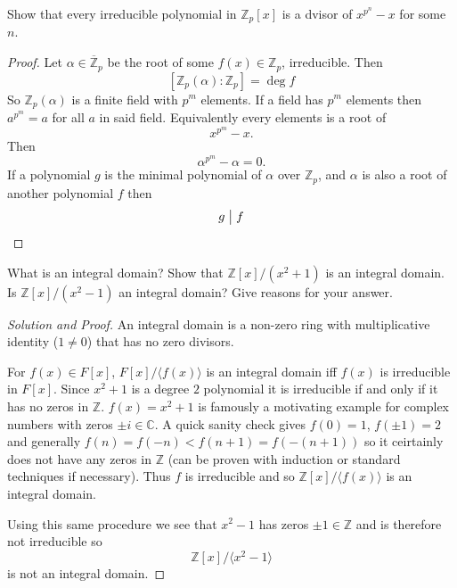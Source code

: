 \begin{prob}
    Show that every irreducible polynomial in 
    $\mathbb Z_p[x]$ is a dvisor of 
    $x^{p^n} - x$ for some $n$.
\end{prob}
\begin{proof}
    Let $\alpha \in \overline{\mathbb Z}_p$ be the root of 
    some $f(x) \in \mathbb Z_p$, irreducible. 
    Then 
    \[
        [\mathbb Z_p(\alpha) : \mathbb Z_p] = \deg f
    \]
    So $\mathbb Z_p(\alpha)$ is a finite field with 
    $p^m$ elements.
    If a field has $p^m$ elements then 
    $a^{p^m} = a$ for all $a$ in said field.
    Equivalently every elements is a root of 
    \[
        x^{p^m} - x.
    \]
    Then 
    \[
        \alpha^{p^m} - \alpha = 0.
    \]
    If a polynomial $g$ is the minimal polynomial of $\alpha$ 
    over $\mathbb Z_p$, and $\alpha$ is also a root of another 
    polynomial $f$ then 
    \[
        g \bigm| f
    \]
\end{proof}
\begin{prob}
    What is an integral domain? Show that 
    $\mathbb Z[x]/(x^2 + 1)$ is an integral domain. 
    Is $\mathbb Z[x]/(x^2 - 1)$ an integral domain?
    Give reasons for your answer.
\end{prob}
\begin{proof}[Solution and Proof]
    An integral domain is a non-zero ring with multiplicative 
    identity ($1 \neq 0$) that has no zero divisors.

    For $f(x) \in F[x]$, $F[x]/\langle f(x) \rangle$ is 
    an integral domain iff $f(x)$ is irreducible in 
    $F[x]$.
    Since $x^2 + 1$ is a degree $2$ polynomial it is 
    irreducible if and only if it has no zeros in 
    $\mathbb Z$. $f(x) = x^2 + 1$ is famously a motivating example 
    for complex numbers with zeros $\pm i \in \mathbb C$. 
    A quick sanity check gives $f(0) = 1$, $f(\pm 1) = 2$ 
    and generally $f(n) = f(-n) < f(n + 1) = f(-(n + 1))$ so 
    it ceirtainly does not have any zeros in $\mathbb Z$ (can 
    be proven with induction or standard techniques if necessary).
    Thus $f$ is irreducible and so $\mathbb Z[x]/\langle f(x) 
    \rangle$ is an integral domain.

    Using this same procedure we see that 
    $x^2 - 1$ has zeros $\pm 1 \in \mathbb Z$ and is therefore 
    not irreducible so 
    \[
        \mathbb Z[x]/\langle x^2 - 1 \rangle
    \]
    is not an integral domain.
\end{proof}

